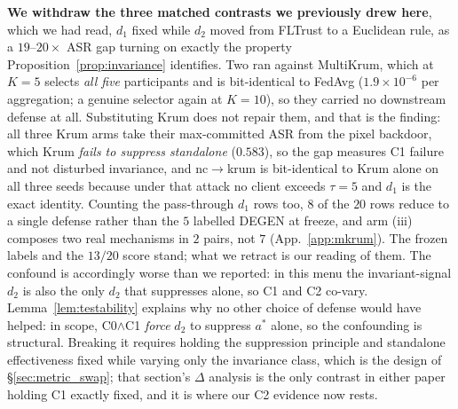 \documentclass{article}
\begin{document}
\noindent \textbf{We withdraw the three matched contrasts we previously drew here}, which we had read, $d_1$ fixed while $d_2$ moved from FLTrust to a Euclidean rule, as a $19$--$20\times$ ASR gap turning on exactly the property Proposition~\ref{prop:invariance} identifies. Two ran against MultiKrum, which at $K{=}5$ selects \emph{all five} participants and is bit-identical to FedAvg ($1.9\times10^{-6}$ per aggregation; a genuine selector again at $K{=}10$), so they carried no downstream defense at all. Substituting Krum does not repair them, and that is the finding: all three Krum arms take their max-committed ASR from the pixel backdoor, which Krum \emph{fails to suppress standalone} ($0.583$), so the gap measures C1 failure and not disturbed invariance, and nc$\to$krum is bit-identical to Krum alone on all three seeds because under that attack no client exceeds $\tau{=}5$ and $d_1$ is the exact identity. Counting the pass-through $d_1$ rows too, $8$ of the $20$ rows reduce to a single defense rather than the $5$ labelled DEGEN at freeze, and arm (iii) composes two real mechanisms in $2$ pairs, not $7$ (App.~\ref{app:mkrum}). The frozen labels and the $13/20$ score stand; what we retract is our reading of them. The confound is accordingly worse than we reported: in this menu the invariant-signal $d_2$ is also the only $d_2$ that suppresses alone, so C1 and C2 co-vary. Lemma~\ref{lem:testability} explains why no other choice of defense would have helped: in scope, C0$\wedge$C1 \emph{force} $d_2$ to suppress $a^*$ alone, so the confounding is structural. Breaking it requires holding the suppression principle and standalone effectiveness fixed while varying only the invariance class, which is the design of §\ref{sec:metric_swap}; that section's $\Delta$ analysis is the only contrast in either paper holding C1 exactly fixed, and it is where our C2 evidence now rests.
\end{document}
